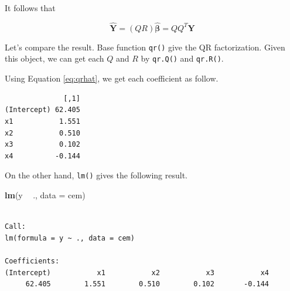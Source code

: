 \documentclass[]{book}
\newenvironment{Shaded}{\begin{snugshade}}{\end{snugshade}}
\newcommand{\DataTypeTok}[1]{\textcolor[rgb]{0.13,0.29,0.53}{#1}}
\newcommand{\KeywordTok}[1]{\textcolor[rgb]{0.13,0.29,0.53}{\textbf{#1}}}
\newcommand{\NormalTok}[1]{#1}
\newcommand{\OperatorTok}[1]{\textcolor[rgb]{0.81,0.36,0.00}{\textbf{#1}}}
\newcommand{\StringTok}[1]{\textcolor[rgb]{0.31,0.60,0.02}{#1}}
\theoremstyle{definition}
\theoremstyle{definition}
\theoremstyle{definition}
\theoremstyle{remark}
\begin{document}
It follows that

\begin{equation}
  \mathbf{\hat{Y}} = (QR)\boldsymbol{\hat\beta} = QQ^T\mathbf{Y}
  \label{eq:qrfit}
\end{equation}

Let's compare the result. Base function \texttt{qr()} give the QR factorization. Given this object, we can get each \(Q\) and \(R\) by \texttt{qr.Q()} and \texttt{qr.R()}.

\begin{Shaded}
\end{Shaded}

Using Equation \eqref{eq:qrhat}, we get each coefficient as follow.

\begin{Shaded}
\end{Shaded}

\begin{verbatim}
              [,1]
(Intercept) 62.405
x1           1.551
x2           0.510
x3           0.102
x4          -0.144
\end{verbatim}

On the other hand, \texttt{lm()} gives the following result.

\begin{Shaded}
\begin{Highlighting}[]
\KeywordTok{lm}\NormalTok{(y }\OperatorTok{~}\StringTok{ }\NormalTok{., }\DataTypeTok{data =}\NormalTok{ cem)}
\end{Highlighting}
\end{Shaded}

\begin{verbatim}

Call:
lm(formula = y ~ ., data = cem)

Coefficients:
(Intercept)           x1           x2           x3           x4  
     62.405        1.551        0.510        0.102       -0.144  
\end{verbatim}
\end{document}

